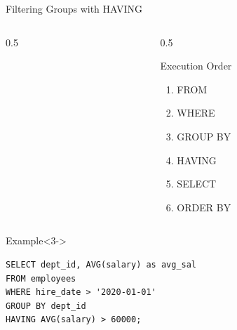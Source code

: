 \documentclass[aspectratio=169,11pt]{beamer}
\begin{document}
\begin{frame}[fragile]{Filtering Groups with HAVING}
\begin{columns}
\begin{column}{0.5\textwidth}
\end{column}
\pause
\begin{column}{0.5\textwidth}
\begin{exampleblock}{Execution Order}
\begin{enumerate}
    \item FROM
    \item WHERE
    \item GROUP BY
    \item HAVING
    \item SELECT
    \item ORDER BY
\end{enumerate}
\end{exampleblock}
\end{column}
\end{columns}

\pause
\begin{exampleblock}{Example}<3->
\begin{lstlisting}
SELECT dept_id, AVG(salary) as avg_sal
FROM employees
WHERE hire_date > '2020-01-01'
GROUP BY dept_id
HAVING AVG(salary) > 60000;
\end{lstlisting}
\end{exampleblock}
\end{frame}

\end{document}
